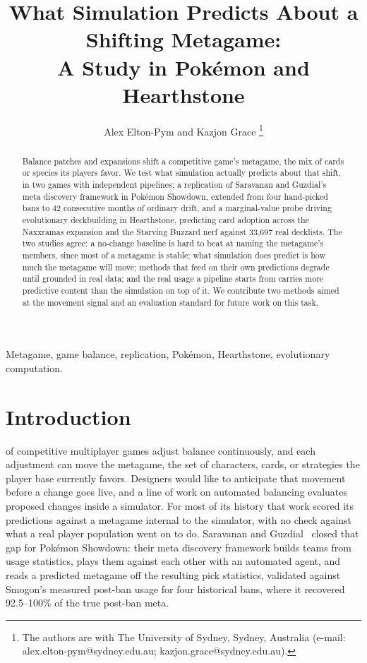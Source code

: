 \documentclass[journal]{IEEEtran}
\newcommand{\pkmn}{Pok\'emon}
\begin{document}
\title{What Simulation Predicts About a Shifting Metagame:\\
A Study in \pkmn{} and Hearthstone}

\author{Alex Elton-Pym and Kazjon Grace%
\thanks{The authors are with The University of Sydney, Sydney, Australia
(e-mail: alex.elton-pym@sydney.edu.au; kazjon.grace@sydney.edu.au).}}


\maketitle

\begin{abstract}
Balance patches and expansions shift a competitive game's metagame, the
mix of cards or species its players favor. We test what simulation
actually predicts about that shift, in two games with independent
pipelines: a replication of Saravanan and Guzdial's meta discovery
framework in \pkmn{} Showdown, extended from four hand-picked bans to 42
consecutive months of ordinary drift, and a marginal-value probe driving
evolutionary deckbuilding in Hearthstone, predicting card adoption across
the Naxxramas expansion and the Starving Buzzard nerf against 33{,}697
real decklists. The two studies agree: a no-change baseline is hard to
beat at naming the metagame's members, since most of a metagame is
stable; what simulation does predict is how much the metagame will move;
methods that feed on their own predictions degrade until grounded in
real data; and the real usage a pipeline starts from carries more
predictive content than the simulation on top of it. We contribute two
methods aimed at the movement signal and an evaluation standard for
future work on this task.
\end{abstract}

\begin{IEEEkeywords}
Metagame, game balance, replication, \pkmn{}, Hearthstone,
evolutionary computation.
\end{IEEEkeywords}

\section{Introduction}

 of competitive multiplayer games adjust
balance continuously, and each adjustment can move the metagame, the set
of characters, cards, or strategies the player base currently favors.
Designers would like to anticipate that movement before a change goes
live, and a line of work on automated balancing evaluates proposed
changes inside a simulator. For most of its history that work scored its
predictions against a metagame internal to the simulator, with no check
against what a real player population went on to do. Saravanan and
Guzdial~\cite{saravanan2024framework} closed that gap for \pkmn{}
Showdown: their meta discovery framework builds teams from usage
statistics, plays them against each other with an automated agent, and
reads a predicted metagame off the resulting pick statistics, validated
against Smogon's measured post-ban usage for four historical bans, where
it recovered 92.5--100\% of the true post-ban meta.
\end{document}

